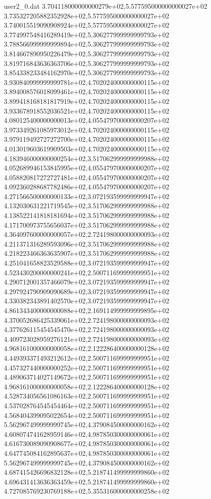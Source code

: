 \begin{filecontents}{user2_0.dat}
3.704118000000000279e+02,5.577595000000000027e+02
3.735327205882352928e+02,5.577595000000000027e+02
3.740015519090908924e+02,5.577595000000000027e+02
3.774997548416289419e+02,5.306277999999999793e+02
3.788566999999999894e+02,5.306277999999999793e+02
3.814667890950226479e+02,5.306277999999999793e+02
3.819716843636363706e+02,5.306277999999999793e+02
3.854338233484162970e+02,5.306277999999999793e+02
3.930840999999999781e+02,4.702024000000000115e+02
3.894008576018099461e+02,4.702024000000000115e+02
3.899418168181817919e+02,4.702024000000000115e+02
3.933678918552036521e+02,4.702024000000000115e+02
4.080125400000000013e+02,4.055479700000000207e+02
3.973349261085973012e+02,4.702024000000000115e+02
3.979119492727272700e+02,4.702024000000000115e+02
4.013019603619909503e+02,4.702024000000000115e+02
4.183946000000000254e+02,3.517062999999999988e+02
4.052689946153845995e+02,4.055479700000000207e+02
4.058820817272727481e+02,4.055479700000000207e+02
4.092360288687782486e+02,4.055479700000000207e+02
4.271566500000000133e+02,3.072193599999999947e+02
4.132030631221719545e+02,3.517062999999999988e+02
4.138522141818181694e+02,3.517062999999999988e+02
4.171700973755656037e+02,3.517062999999999988e+02
4.364097600000000057e+02,2.724198000000000093e+02
4.211371316289593096e+02,3.517062999999999988e+02
4.218223466363635907e+02,3.517062999999999988e+02
4.251041658823529588e+02,3.072193599999999947e+02
4.523430200000000241e+02,2.500711699999999951e+02
4.290712001357466079e+02,3.072193599999999947e+02
4.297924790909090689e+02,3.072193599999999947e+02
4.330382343891402570e+02,3.072193599999999947e+02
4.861343400000000088e+02,2.169114999999999895e+02
4.370052686425339061e+02,2.724198000000000093e+02
4.377626115454545470e+02,2.724198000000000093e+02
4.409723028959276121e+02,2.724198000000000093e+02
4.968161000000000058e+02,2.122286400000000128e+02
4.449393371493212612e+02,2.500711699999999951e+02
4.457327440000000252e+02,2.500711699999999951e+02
4.489063714027149672e+02,2.500711699999999951e+02
4.968161000000000058e+02,2.122286400000000128e+02
4.528734056561086163e+02,2.500711699999999951e+02
4.537028764545454464e+02,2.500711699999999951e+02
4.568404399095022654e+02,2.500711699999999951e+02
5.562967499999999745e+02,4.379084500000000162e+02
4.608074741628959146e+02,4.987850300000000061e+02
4.616730089090908677e+02,4.987850300000000061e+02
4.647745084162895637e+02,4.987850300000000061e+02
5.562967499999999745e+02,4.379084500000000162e+02
4.687415426696832128e+02,5.218741499999999860e+02
4.696431413636363459e+02,5.218741499999999860e+02
4.727085769230769188e+02,5.355316000000000258e+02

\end{filecontents}
